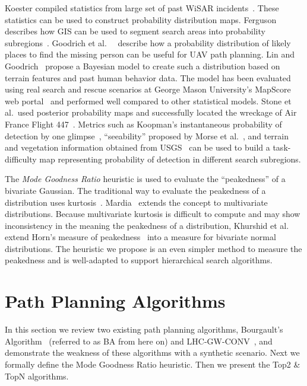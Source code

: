 Koester compiled statistics from large set of past WiSAR incidents~\cite{Koester2008Lost}. These statistics can be used to construct probability distribution maps. Ferguson describes how GIS can be used to segment search areas into probability subregions~\cite{Ferguson2008GIS}. Goodrich et al.\ ~\cite{Goodrich2008Supporting} describe how a probability distribution of likely places to find the missing person can be useful for UAV path planning. Lin and Goodrich~\cite{Lin2010Bayesian} propose a Bayesian model to create such a distribution based on terrain features and past human behavior data. The model has been evaluated using real search and rescue scenarios at George Mason University's MapScore web portal~\cite{Twardy2012MapScore}
and performed well compared to other statistical models. Stone et al.\ used posterior probability maps and successfully located the wreckage of Air France Flight 447~\cite{Stone2011Search}. Metrics such as Koopman's instantaneous probability of detection by one glimpse~\cite{Koopman1956Theory}, ``seeability'' proposed by Morse et al.\ \cite{Morse2010UAV}, and terrain and vegetation information obtained from USGS~\cite{Lin2010Bayesian} can be used to build a task-difficulty map representing probability of detection in different search subregions.

The \textit{Mode Goodness Ratio} heuristic is used to evaluate the ``peakedness'' of a bivariate Gaussian. The traditional way to evaluate the peakedness of a distribution uses kurtosis~\cite{Balanda1988Kurtosis}. Mardia~\cite{Mardia1970Measures} extends the concept to multivariate distributions. Because multivariate kurtosis is difficult to compute and may show inconsistency in the meaning the peakedness
of a distribution, Khurshid et al.\ ~\cite{Khurshid2007Note} extend Horn's measure of peakedness~\cite{Horn1983Measure} into a measure for bivariate normal distributions. The heuristic we propose is an even simpler method to measure the peakedness and is well-adapted to support hierarchical search algorithms.

\section{Path Planning Algorithms}
\label{sec:PathPlanningAlgorithms}

In this section we review two existing path planning algorithms, Bourgault's Algorithm~\cite{Bourgault2006Optimal} (referred to as BA from here on) and LHC-GW-CONV~\cite{Lin2009UAV}, and demonstrate the weakness of these algorithms with a synthetic scenario. Next we formally define the Mode Goodness Ratio heuristic. Then we present the Top2 \& TopN algorithms.

